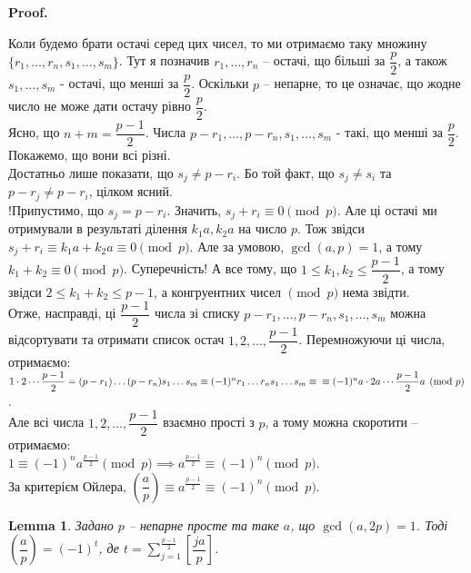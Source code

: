 \documentclass[a4paper, 14pt]{extarticle}
\makeatletter
\theoremstyle{theoremdd}
\theoremstyle{theoremdd}
\theoremstyle{theoremdd}
\theoremstyle{theoremdd}
\theoremstyle{theoremdd}
\theoremstyle{theoremdd}
\theoremstyle{theoremdd}
\newtheorem{lemma}[theorem]{Lemma}
\theoremstyle{theoremdd}
\def\qed{$\blacksquare$}
\renewenvironment{proof}[1][Proof.\\]{\par
\pushQED{\hfill \qed}%
\normalfont \topsep6\p@\@plus6\p@\relax
\trivlist
\item\relax
{\bfseries
#1\@addpunct{.}}\hspace\labelsep\ignorespaces
}{%
\popQED\endtrivlist\@endpefalse
}
\makeatother
\begin{document}
\begin{proof}
Коли будемо брати остачі серед цих чисел, то ми отримаємо таку множину $\{r_1,\dots,r_n,s_1,\dots,s_m\}$. Тут я позначив $r_1,\dots,r_n$ -- остачі, що більші за $\dfrac{p}{2}$, а також $s_1,\dots,s_m$ - остачі, що менші за $\dfrac{p}{2}$. Оскільки $p$ -- непарне, то це означає, що жодне число не може дати остачу рівно $\dfrac{p}{2}$.\\
Ясно, що $n+m = \dfrac{p-1}{2}$. Числа $p-r_1,\dots,p-r_n,s_1,\dots,s_m$ - такі, що менші за $\dfrac{p}{2}$. Покажемо, що вони всі різні.\\
Достатньо лише показати, що $s_j \neq p-r_i$. Бо той факт, що $s_j \neq s_i$ та $p-r_j \neq p-r_i$, цілком ясний.\\
!Припустимо, що $s_j = p-r_i$. Значить, $s_j + r_i \equiv 0 \pmod p$. Але ці остачі ми отримували в результаті ділення $k_1a, k_2a$ на число $p$. Тож звідси $s_j + r_i \equiv k_1a+k_2a \equiv 0 \pmod p$. Але за умовою, $\gcd(a,p)=1$, а тому $k_1+k_2 \equiv 0 \pmod p$. Суперечність! А все тому, що $1 \leq k_1,k_2 \leq \dfrac{p-1}{2}$, а тому звідси $2 \leq k_1+k_2 \leq p-1$, а конгруентних чисел $\pmod p$ нема звідти.\\
Отже, насправді, ці $\dfrac{p-1}{2}$ числа зі списку $p-r_1,\dots,p-r_n,s_1,\dots,s_m$ можна відсортувати та отримати список остач $1,2,\dots,\dfrac{p-1}{2}$. Перемножуючи ці числа, отримаємо:\\
$1 \cdot 2 \cdots \dfrac{p-1}{2} = (p-r_1) \dots (p-r_n) s_1 \dots s_m \equiv (-1)^n r_1 \dots r_n s_1 \dots s_m \equiv \\
\equiv (-1)^n a \cdot 2a \cdots \dfrac{p-1}{2}a \pmod p$.\\
Але всі числа $1,2,\dots,\dfrac{p-1}{2}$ взаємно прості з $p$, а тому можна скоротити -- отримаємо:\\
$1 \equiv (-1)^n a^{\textstyle\frac{p-1}{2}} \pmod p \implies a^{\textstyle\frac{p-1}{2}} \equiv (-1)^n \pmod p$.\\
За критерієм Ойлера, $\left( \dfrac{a}{p} \right) \equiv a^{\textstyle\frac{p-1}{2}} \equiv (-1)^n \pmod p$.
\end{proof}

\begin{lemma}
Задано $p$ -- непарне просте та таке $a$, що $\gcd(a,2p) = 1$. Тоді $\left( \dfrac{a}{p} \right) = (-1)^t$, де $t = \displaystyle\sum_{j=1}^{\frac{p-1}{2}} \left[ \dfrac{ja}{p} \right]$.
\end{lemma}
\end{document}
